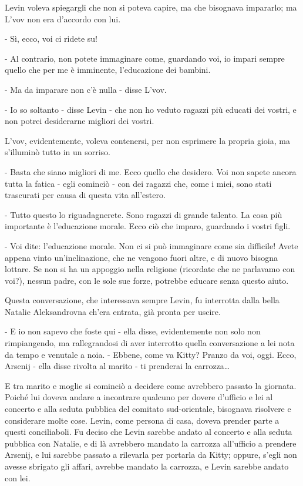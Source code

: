 Levin voleva spiegargli che non si poteva capire, ma che bisognava impararlo; ma L'vov non era d'accordo con lui. 

- Sì, ecco, voi ci ridete su! 

- Al contrario, non potete immaginare come, guardando voi, io impari sempre quello che per me è imminente, l'educazione dei bambini. 

- Ma da imparare non c'è nulla - disse L'vov. 

- Io so soltanto - disse Levin - che non ho veduto ragazzi più educati dei vostri, e non potrei desiderarne migliori dei vostri. 

L'vov, evidentemente, voleva contenersi, per non esprimere la propria gioia, ma s'illuminò tutto in un sorriso. 

- Basta che siano migliori di me. Ecco quello che desidero. Voi non sapete ancora tutta la fatica - egli cominciò - con dei ragazzi che, come i miei, sono stati trascurati per causa di questa vita all'estero. 

- Tutto questo lo riguadagnerete. Sono ragazzi di grande talento. La cosa più importante è l'educazione morale. Ecco ciò che imparo, guardando i vostri figli. 

- Voi dite: l'educazione morale. Non ci si può immaginare come sia difficile! Avete appena vinto un'inclinazione, che ne vengono fuori altre, e di nuovo bisogna lottare. Se non si ha un appoggio nella religione (ricordate che ne parlavamo con voi?), nessun padre, con le sole sue forze, potrebbe educare senza questo aiuto. 

Questa conversazione, che interessava sempre Levin, fu interrotta dalla bella Natalie Aleksandrovna ch'era entrata, già pronta per uscire. 

- E io non sapevo che foste qui - ella disse, evidentemente non solo non rimpiangendo, ma rallegrandosi di aver interrotto quella conversazione a lei nota da tempo e venutale a noia. - Ebbene, come va Kitty? Pranzo da voi, oggi. Ecco, Arsenij - ella disse rivolta al marito - ti prenderai la carrozza\ldots{} 

E tra marito e moglie si cominciò a decidere come avrebbero passato la giornata. Poiché lui doveva andare a incontrare qualcuno per dovere d'ufficio e lei al concerto e alla seduta pubblica del comitato sud-orientale, bisognava risolvere e considerare molte cose. Levin, come persona di casa, doveva prender parte a questi conciliaboli. Fu deciso che Levin sarebbe andato al concerto e alla seduta pubblica con Natalie, e di là avrebbero mandato la carrozza all'ufficio a prendere Arsenij, e lui sarebbe passato a rilevarla per portarla da Kitty; oppure, s'egli non avesse sbrigato gli affari, avrebbe mandato la carrozza, e Levin sarebbe andato con lei. 

